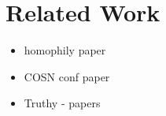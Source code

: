 \section{Related Work}
\label{sec:background}
\begin{itemize}
\item homophily paper
\item COSN conf paper
\item Truthy - papers
\end{itemize}